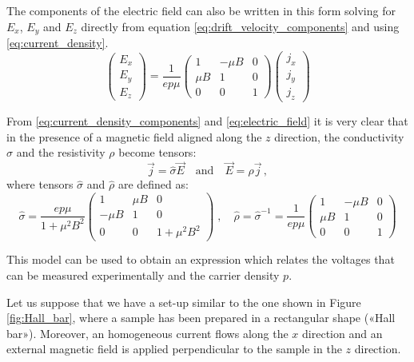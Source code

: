 \documentclass[11pt,a4paper]{article}
\begin{document}
The components of the electric field can also be written in this form solving for $E_x$, $E_y$ and $E_z$ directly from equation \eqref{eq:drift_velocity_components} and using \eqref{eq:current_density}.
\begin{equation}\label{eq:electric_field}
\begin{pmatrix}
E_x \\ E_y \\ E_z
\end{pmatrix}=
\frac{1}{ep\mu}
\begin{pmatrix}
1 & -\mu B & 0 \\
\mu B & 1 & 0 \\
0 & 0 & 1
\end{pmatrix}
\begin{pmatrix}
j_x \\ j_y \\ j_z
\end{pmatrix}
\end{equation}

From \eqref{eq:current_density_components} and \eqref{eq:electric_field} it is very clear that in the presence of a magnetic field aligned along the $z$ direction, the conductivity $\sigma$ and the resistivity $\rho$ become tensors:
\begin{equation*}
\vec{j}=\hat{\sigma}\vec{E}\quad\text{and}\quad\vec{E}=\hat{\rho}\vec{j}\,,
\end{equation*}
where tensors $\hat{\sigma}$ and $\hat{\rho}$ are defined as:
\begin{equation}\label{eq:resistivity_tensor}
\hat{\sigma}=
\frac{ep\mu}{1+\mu^2B^2}
\begin{pmatrix}
1 & \mu B & 0 \\
-\mu B & 1 & 0 \\
0 & 0 & 1+\mu^2B^2
\end{pmatrix}\;,\quad
\hat{\rho}=\hat{\sigma}^{-1}=
\frac{1}{ep\mu}
\begin{pmatrix}
1 & -\mu B & 0 \\
\mu B & 1 & 0 \\
0 & 0 & 1
\end{pmatrix}
\end{equation}

This model can be used to obtain an expression which relates the voltages that can be measured experimentally and the carrier density $p$.

Let us suppose that we have a set-up similar to the one shown in Figure \ref{fig:Hall_bar}, where a sample has been prepared in a rectangular shape («Hall bar»). Moreover, an homogeneous current flows along the $x$ direction and an external magnetic field is applied perpendicular to the sample in the $z$ direction.
\end{document}
